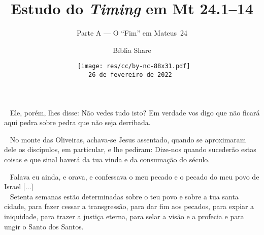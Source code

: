 \documentclass[12pt,aspectratio=169]{beamer}
\title{Estudo do \textit{Timing} em Mt 24.1--14}
\subtitle{Parte A --- O ``Fim'' em Mateus~24}
\author{Bíblia Share}
\date[{\tiny\tt{26 de fevereiro de 2022}}]{{\scriptsize\tt%
    \texttt{[image: res/cc/by-nc-88x31.pdf]}\\[\smallskipamount]
    26 de fevereiro de 2022%
}}
\newcommand{\ver}[1]{%
    \raisebox{0.50ex}{%
        \scalebox{1.1}{%
            \pmb{\textbf{\textcolor{BSpbg}{#1}}}%
        }%
    }%
}
\newcommand{\QUOTE}[1]{%
    \par\noindent\hspace*{0.1\linewidth}%
    \begin{minipage}{0.8\linewidth}%
        \linespread{1.35}\large{#1}%
    \end{minipage}%
}
\newcommand{\ORA}[1]{{\textcolor{TXora}{#1}}}
\newcommand{\YEL}[1]{{\textcolor{TXyel}{#1}}}
\newcommand{\GRE}[1]{{\textcolor{TXgre}{#1}}}
\newcommand{\MAG}[1]{{\textcolor{TXmag}{#1}}}
\newcommand{\BRI}[1]{{\textcolor{BSpbg}{#1}}}   %
\begin{document}
\begin{frame}
    \titlepage
\end{frame}

    \begin{frame}
        \QUOTE{%
            \ver{(ARA) Mt~24.2}~%
            Ele, porém, lhes disse: \YEL{Não vedes tudo  isto?}  Em  verdade  vos  digo  que
            \YEL{não ficará aqui pedra sobre pedra que não seja derribada.}
        }
    \end{frame}

    \begin{frame}
        \QUOTE{%
            \ver{(ARA) Mt~24.3}~%
            No monte das Oliveiras, achava-se Jesus assentado, quando se aproximaram dele os
            discípulos, \BRI{em particular}, e lhe pediram: Dize-nos  \YEL{quando  sucederão
            estas coisas} e \GRE{que sinal haverá da tua  vinda}  e  da  \MAG{consumação  do
            século}.
        }
    \end{frame}

    \begin{frame}
        \QUOTE{%
            \ver{(ARA) Dn~9.20a}~%
            Falava eu ainda, e orava, e confessava o meu pecado e o pecado do \YEL{meu  povo
            de Israel} [...] \\[\bigskipamount]
            \ver{(ARA) Dn~9.24}~%
            \GRE{Setenta semanas} estão \MAG{determinadas} sobre \YEL{o teu  povo}  e  sobre
            \ORA{a tua santa cidade}, para fazer cessar a transgressão,  para  dar  fim  aos
            pecados, para expiar a iniquidade, para trazer a justiça eterna,  para  selar  a
            visão e a profecia e para ungir o Santo dos Santos.
        }
    \end{frame}
\end{document}
